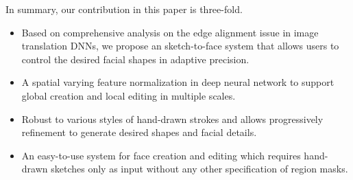 

In summary, our contribution in this paper is three-fold.
\begin{itemize}
	\item Based on comprehensive analysis on the edge alignment issue in image translation DNNs, we propose an sketch-to-face system that allows users to control the desired facial shapes in adaptive precision. 
	\item A spatial varying feature normalization in deep neural network to support global creation and local editing in multiple scales. 
	
	\item Robust to various styles of hand-drawn strokes and allows progressively refinement to generate desired shapes and facial details. 
	
	\item An easy-to-use system for face creation and editing which requires hand-drawn sketches only as input without any other specification of region masks.
\end{itemize}